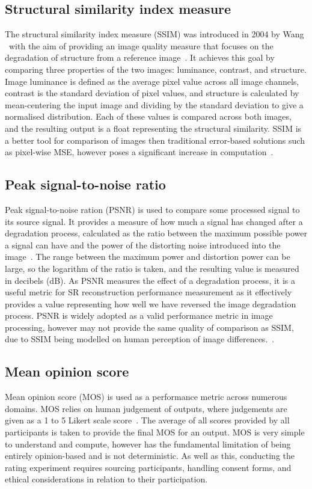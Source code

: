 \subsection{Structural similarity index measure}
The structural similarity index measure (SSIM) was introduced in 2004 by Wang \etal\ with the aim of providing an image quality measure that focuses on the degradation of structure from a reference image~\cite{ssim}. It achieves this goal by comparing three properties of the two images: luminance, contrast, and structure. Image luminance is defined as the average pixel value across all image channels, contrast is the standard deviation of pixel values, and structure is calculated by mean-centering the input image and dividing by the standard deviation to give a normalised distribution. Each of these values is compared across both images, and the resulting output is a float representing the structural similarity. SSIM is a better tool for comparison of images then traditional error-based solutions such as pixel-wise MSE, however poses a significant increase in computation~\cite{ssim}.

\subsection{Peak signal-to-noise ratio}
Peak signal-to-noise ration (PSNR) is used to compare some processed signal to its source signal. It provides a measure of how much a signal has changed after a degradation process, calculated as the ratio between the maximum possible power a signal can have and the power of the distorting noise introduced into the image~\cite{psnr}. The range between the maximum power and distortion power can be large, so the logarithm of the ratio is taken, and the resulting value is measured in decibels (dB). As PSNR measures the effect of a degradation process, it is a useful metric for SR reconstruction performance measurement as it effectively provides a value representing how well we have reversed the image degradation process. PSNR is widely adopted as a valid performance metric in image processing, however may not provide the same quality of comparison as SSIM, due to SSIM being modelled on human perception of image differences.~\cite{psnrAnalysis}.

\subsection{Mean opinion score}
Mean opinion score (MOS) is used as a performance metric across numerous domains. MOS relies on human judgement of outputs, where judgements are given as a 1 to 5 Likert scale score~\cite{srgan}. The average of all scores provided by all participants is taken to provide the final MOS for an output. MOS is very simple to understand and compute, however has the fundamental limitation of being entirely opinion-based and is not deterministic. As well as this, conducting the rating experiment requires sourcing participants, handling consent forms, and ethical considerations in relation to their participation.


